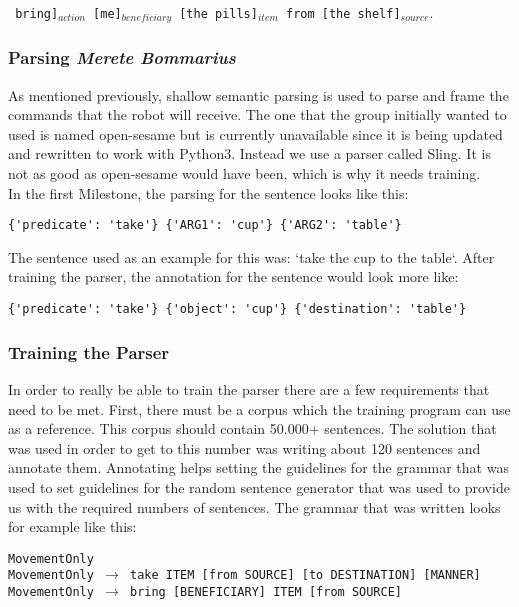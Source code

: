 \documentclass[main.tex]{subfiles}
\begin{document}
            \texttt{ bring]$_{action}$  [me]$_{beneficiary}$ [the pills]$_{item}$ from [the shelf]$_{source}.$}
        \subsubsection{Parsing \small{\textit{Merete Bommarius}}}     
            As mentioned previously, shallow semantic parsing is used to parse and frame the commands that the robot will receive. The one that the group initially wanted to used is named open-sesame but is currently unavailable since it is being updated and rewritten to work with Python3. Instead we use a parser called Sling. It is not as good as open-sesame would have been, which is why it needs training.\\ 
            In the first Milestone, the parsing for the sentence looks like this:
    
\begin{lstlisting}
{'predicate': 'take'} {'ARG1': 'cup'} {'ARG2': 'table'}
\end{lstlisting}
            
            The sentence used as an example for this was: ‘take the cup to the table‘. After training the parser, the annotation for the sentence would look more like:
            
\begin{lstlisting}
{'predicate': 'take'} {'object': 'cup'} {'destination': 'table'}
\end{lstlisting}
            
        \subsubsection{Training the Parser}
            In order to really be able to train the parser there are a few requirements that need to be met. First, there must be a corpus which the training program can use as a reference. This corpus should contain 50.000+ sentences. The solution that was used in order to get to this number was writing about 120 sentences and annotate them. Annotating helps setting the guidelines for the grammar that was used to set guidelines for the random sentence generator that was used to provide us with the required numbers of sentences.
            The grammar that was written looks for example like this:
            
            
\texttt{MovementOnly\\
                MovementOnly $\rightarrow$ take ITEM [from SOURCE] [to DESTINATION] [MANNER]\\
                MovementOnly $\rightarrow$ bring [BENEFICIARY] ITEM [from SOURCE]}
                
\end{document}
